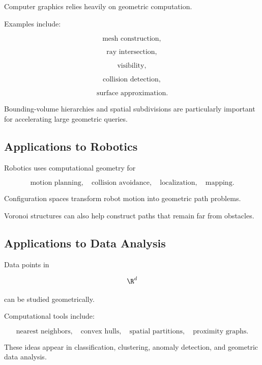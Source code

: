Computer graphics relies heavily on geometric computation.

Examples include:

\[
\boxed{
\text{mesh construction},
}
\]

\[
\boxed{
\text{ray intersection},
}
\]

\[
\boxed{
\text{visibility},
}
\]

\[
\boxed{
\text{collision detection},
}
\]

\[
\boxed{
\text{surface approximation}.
}
\]

Bounding-volume hierarchies and spatial subdivisions are particularly
important for accelerating large geometric queries.

\subsection{Applications to Robotics}
\label{subsec:computational-geometry-robotics}

Robotics uses computational geometry for

\[
\boxed{
\text{motion planning},
\quad
\text{collision avoidance},
\quad
\text{localization},
\quad
\text{mapping}.
}
\]

Configuration spaces transform robot motion into geometric path problems.

Voronoi structures can also help construct paths that remain far from
obstacles.

\subsection{Applications to Data Analysis}
\label{subsec:computational-geometry-data}

Data points in

\[
\R^d
\]

can be studied geometrically.

Computational tools include:

\[
\boxed{
\text{nearest neighbors},
\quad
\text{convex hulls},
\quad
\text{spatial partitions},
\quad
\text{proximity graphs}.
}
\]

These ideas appear in classification, clustering, anomaly detection, and
geometric data analysis.

